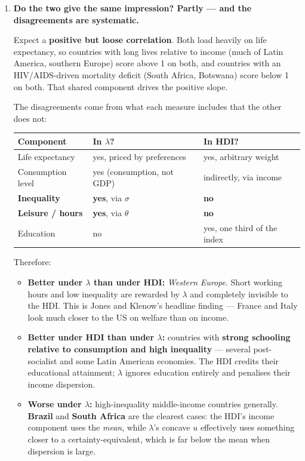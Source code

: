 \documentclass[12pt, letterpaper]{article}
\begin{document}
\begin{tcolorbox}[oddbox,title={Problem 2.1 \quad Comparing the HDI and the Jones \& Klenow Welfare Measure}]
\begin{enumerate}
Both are \textbf{residual} measures --- they strip out income and show what the non-income
components add. That is what makes them comparable on a scatterplot.

\item \textbf{Do the two give the same impression? Partly --- and the disagreements are
systematic.}

Expect a \textbf{positive but loose correlation}. Both load heavily on life expectancy, so
countries with long lives relative to income (much of Latin America, southern Europe) score
above 1 on both, and countries with an HIV/AIDS-driven mortality deficit (South Africa,
Botswana) score below 1 on both. That shared component drives the positive slope.

The disagreements come from what each measure includes that the other does not:

\begin{center}
\begin{tabular}{p{}p{}p{}}
\toprule
\textbf{Component} & \textbf{In $\lambda$?} & \textbf{In HDI?} \\
\midrule
Life expectancy   & yes, priced by preferences & yes, arbitrary weight \\
Consumption level & yes (consumption, not GDP) & indirectly, via income \\
\textbf{Inequality} & \textbf{yes}, via $\sigma$ & \textbf{no} \\
\textbf{Leisure / hours} & \textbf{yes}, via $\theta$ & \textbf{no} \\
Education & no & yes, one third of the index \\
\bottomrule
\end{tabular}
\end{center}

Therefore:
\begin{itemize}[leftmargin=1.3em,itemsep=3pt,topsep=2pt]
\item \textbf{Better under $\lambda$ than under HDI:} \emph{Western Europe}. Short working
hours and low inequality are rewarded by $\lambda$ and completely invisible to the
HDI. This is Jones and Klenow's headline finding --- France and Italy look much closer
to the US on welfare than on income.
\item \textbf{Better under HDI than under $\lambda$:} countries with \textbf{strong schooling
relative to consumption and high inequality} --- several post-socialist and some Latin
American economies. The HDI credits their educational attainment; $\lambda$ ignores
education entirely and penalises their income dispersion.
\item \textbf{Worse under $\lambda$:} high-inequality middle-income countries generally.
\textbf{Brazil} and \textbf{South Africa} are the clearest cases: the HDI's income
component uses the \emph{mean}, while $\lambda$'s concave $u$ effectively uses
something closer to a certainty-equivalent, which is far below the mean when dispersion
is large.
\end{itemize}


\end{enumerate}
\end{tcolorbox}
\end{document}
